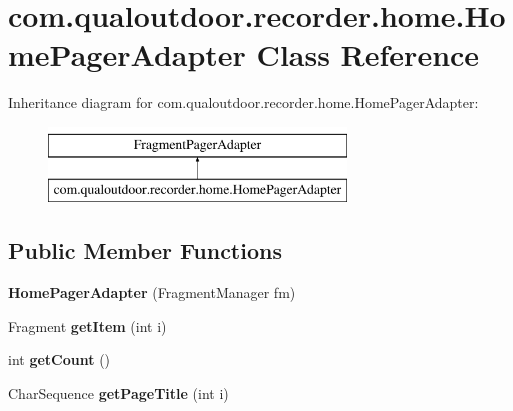 \hypertarget{classcom_1_1qualoutdoor_1_1recorder_1_1home_1_1HomePagerAdapter}{\section{com.\-qualoutdoor.\-recorder.\-home.\-Home\-Pager\-Adapter Class Reference}
\label{classcom_1_1qualoutdoor_1_1recorder_1_1home_1_1HomePagerAdapter}
}
Inheritance diagram for com.\-qualoutdoor.\-recorder.\-home.\-Home\-Pager\-Adapter\-:\begin{figure}[H]
\begin{center}
\leavevmode
\includegraphics[height=2.000000cm]{classcom_1_1qualoutdoor_1_1recorder_1_1home_1_1HomePagerAdapter}
\end{center}
\end{figure}
\subsection*{Public Member Functions}
\begin{DoxyCompactItemize}
\item 
\hypertarget{classcom_1_1qualoutdoor_1_1recorder_1_1home_1_1HomePagerAdapter_a9a6e09a535a8819655f34a0cb5203db3}{{\bfseries Home\-Pager\-Adapter} (Fragment\-Manager fm)}\label{classcom_1_1qualoutdoor_1_1recorder_1_1home_1_1HomePagerAdapter_a9a6e09a535a8819655f34a0cb5203db3}

\item 
\hypertarget{classcom_1_1qualoutdoor_1_1recorder_1_1home_1_1HomePagerAdapter_a15792647904bbe926976c0c769657a02}{Fragment {\bfseries get\-Item} (int i)}\label{classcom_1_1qualoutdoor_1_1recorder_1_1home_1_1HomePagerAdapter_a15792647904bbe926976c0c769657a02}

\item 
\hypertarget{classcom_1_1qualoutdoor_1_1recorder_1_1home_1_1HomePagerAdapter_a046bdc85b518908ca2b5f90deff474ca}{int {\bfseries get\-Count} ()}\label{classcom_1_1qualoutdoor_1_1recorder_1_1home_1_1HomePagerAdapter_a046bdc85b518908ca2b5f90deff474ca}

\item 
\hypertarget{classcom_1_1qualoutdoor_1_1recorder_1_1home_1_1HomePagerAdapter_a8c933c6a6608ff298bab7c13f8e6eab8}{Char\-Sequence {\bfseries get\-Page\-Title} (int i)}\label{classcom_1_1qualoutdoor_1_1recorder_1_1home_1_1HomePagerAdapter_a8c933c6a6608ff298bab7c13f8e6eab8}

\end{DoxyCompactItemize}
